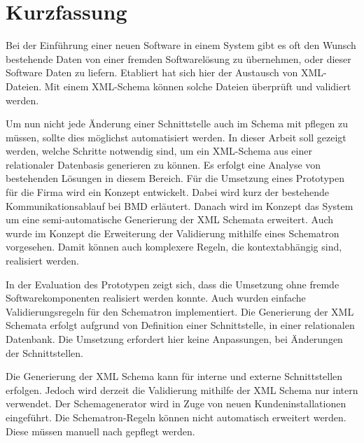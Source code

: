 \chapter{Kurzfassung}

Bei der Einführung einer neuen Software in einem System gibt es oft den Wunsch bestehende Daten von einer fremden Softwarelösung zu übernehmen, oder dieser Software Daten zu liefern. Etabliert hat sich hier der Austausch von XML-Dateien. Mit einem XML-Schema können solche Dateien überprüft und validiert werden.

Um nun nicht jede Änderung einer Schnittstelle auch im Schema mit pflegen zu müssen, sollte dies möglichst automatisiert werden. 
In dieser Arbeit soll gezeigt werden, welche Schritte notwendig sind, um ein XML-Schema aus einer relationaler Datenbasis generieren zu können. 
Es erfolgt eine Analyse von bestehenden Lösungen in diesem Bereich. 
Für die Umsetzung eines Prototypen für die Firma \BMD wird ein Konzept entwickelt. Dabei wird kurz der bestehende Kommunikationsablauf bei BMD erläutert. Danach wird im Konzept das System um eine semi-automatische Generierung der XML Schemata erweitert. Auch wurde im Konzept die Erweiterung der Validierung mithilfe eines Schematron vorgesehen. Damit können auch komplexere Regeln, die kontextabhängig sind, realisiert werden.

In der Evaluation des Prototypen zeigt sich, dass die Umsetzung ohne fremde Softwarekomponenten realisiert werden konnte. Auch wurden einfache Validierungsregeln für den Schematron implementiert. Die Generierung der XML Schemata erfolgt aufgrund von Definition einer Schnittstelle, in einer relationalen Datenbank. Die Umsetzung erfordert hier keine Anpassungen, bei Änderungen der Schnittstellen.

Die Generierung der XML Schema kann für interne und externe Schnittstellen erfolgen. Jedoch wird derzeit die Validierung mithilfe der XML Schema nur intern verwendet.
Der Schemagenerator wird in Zuge von neuen Kundeninstallationen eingeführt. Die Schematron-Regeln können nicht automatisch erweitert werden. Diese müssen manuell nach gepflegt werden.